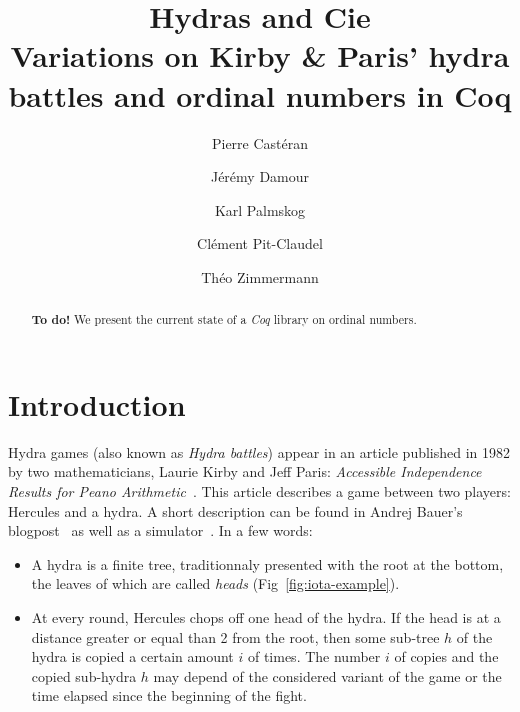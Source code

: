 \documentclass{easychair}
\title{Hydras and Cie  \\
  Variations on Kirby \& Paris' hydra battles and ordinal numbers in Coq}
\author{
Pierre Castéran \inst{1}
\and
    Jérémy Damour \inst{2}
\and
Karl Palmskog \inst{2}
\and Clément Pit-Claudel \inst{2}
\and Théo Zimmermann %
}
\institute{
 LaBRI, Université Bordeaux \\
  \email{pierre.casteran@labri.fr}
\and
   Ask for agreement !
 }
\begin{document}
\maketitle


\begin{abstract}
  \textbf{To do!} We present the current state of a \textit{Coq} library on ordinal numbers.
 
\end{abstract}




\section{Introduction}
\label{sect:introduction}
Hydra games (also known as \emph{Hydra battles}) appear in an article published in 1982 by two mathematicians, 
Laurie Kirby and Jeff Paris: \emph{Accessible Independence Results for Peano Arithmetic}~\cite{KP82}.
This article describes a game between two players: Hercules and a hydra.
A short description  can be found in Andrej Bauer's blogpost~\cite{bauer2008} as well as a simulator~\cite{BauerHydra}.
In a few words:
\begin{itemize}
\item A hydra is a finite tree, traditionnaly presented with the root at the bottom, the leaves of which are called \emph{heads}
  (Fig~\vref{fig:iota-example}).
\item At every round, Hercules chops off one head of the hydra. If the head is at a distance greater or equal than 2 from the root,
  then some sub-tree $h$ of the hydra is copied a certain amount $i$ of times. The number $i$ of copies and the copied sub-hydra $h$ may depend of the considered variant of the game
  or the time elapsed since the beginning of the fight.
\end{itemize}
\end{document}
